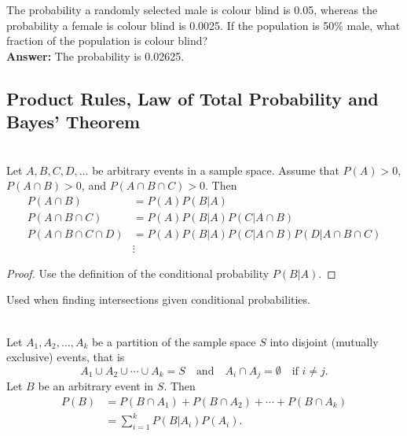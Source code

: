 \begin{example}
    The probability a randomly selected male is colour blind is 0.05, whereas the probability a female is colour blind is 0.0025. If the population is
    50\% male, what fraction of the population is colour blind? \\
    \textbf{Answer: } The probability is 0.02625.
\end{example}

\newpage


\subsection{Product Rules, Law of Total Probability and Bayes' Theorem}

\begin{theorem}
    \phantom{}  \\
    Let $A, B, C, D, \ldots$ be arbitrary events in a sample space. Assume that $P(A) > 0$,
    $P(A \cap B) > 0$, and $P(A \cap B \cap C) > 0$. Then
    \begin{align*}
        P(A \cap B) &= P(A)P(B|A)     \\
        P(A \cap B \cap C) &= P(A)P(B|A)P(C|A\cap B)     \\
        P(A \cap B \cap C \cap D) &= P(A)P(B|A)P(C|A\cap B)P(D|A\cap B\cap C)    \\
        &\vdots
    \end{align*}
\end{theorem}

\begin{proof}
    Use the definition of the conditional probability $P(B|A)$.
\end{proof}

\begin{note}
    Used when finding intersections given conditional probabilities.
\end{note}

\begin{theorem}
    \phantom{}  \\
    Let $A_1, A_2, \ldots, A_k$ be a partition of the sample space $S$ into disjoint
    (mutually exclusive) events, that is 
    \[A_1 \cup A_2 \cup \cdots \cup A_k = S \quad \text{and} \quad A_i \cap A_j = \emptyset \quad \text{if $i \neq j$.}\]
    Let $B$ be an arbitrary event in $S$. Then
    \begin{align*}
        P(B) &= P(B\cap A_1) + P(B\cap A_2) + \cdots + P(B\cap A_k)    \\
             &= \sum_{i=1}^{k} P(B|A_i) P(A_i).
    \end{align*}
\end{theorem}

